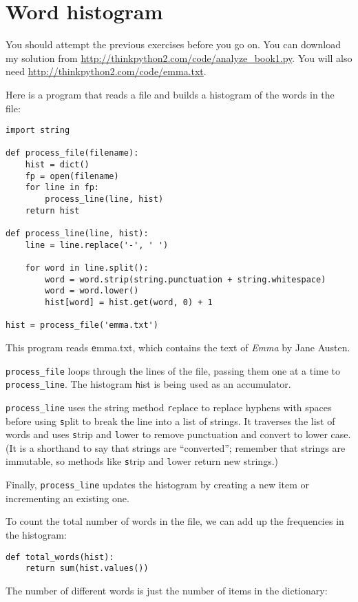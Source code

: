 \documentclass[
DIV=11,
fontsize=13,
twoside,
headinclude=false,
titlepage=firstiscover,
abstract=true,
headsepline=true,
footsepline=true,
chapterprefix=true, %
headings=big,
bibliography=totoc,%
captions=tableheading
]{scrbook}
\theoremstyle{definition}
\begin{document}
\section{Word histogram}

You should attempt the previous exercises before you go on.
You can download my solution from
 \url{http://thinkpython2.com/code/analyze_book1.py}.  You will
also need \url{http://thinkpython2.com/code/emma.txt}.

Here is a program that reads a file and builds a histogram of the
words in the file:

\begin{lstlisting}
import string

def process_file(filename):
    hist = dict()
    fp = open(filename)
    for line in fp:
        process_line(line, hist)
    return hist

def process_line(line, hist):
    line = line.replace('-', ' ')
    
    for word in line.split():
        word = word.strip(string.punctuation + string.whitespace)
        word = word.lower()
        hist[word] = hist.get(word, 0) + 1

hist = process_file('emma.txt')
\end{lstlisting}
%
This program reads {\texttt emma.txt}, which contains the text of {\em
  Emma} by Jane Austen.

\verb"process_file" loops through the lines of the file,
passing them one at a time to \verb"process_line".  The histogram
{\texttt hist} is being used as an accumulator.

\verb"process_line" uses the string method {\texttt replace} to replace
hyphens with spaces before using {\texttt split} to break the line into a
list of strings.  It traverses the list of words and uses {\texttt strip}
and {\texttt lower} to remove punctuation and convert to lower case.  (It
is a shorthand to say that strings are ``converted''; remember that
strings are immutable, so methods like {\texttt strip} and {\texttt lower}
return new strings.)

Finally, \verb"process_line" updates the histogram by creating a new
item or incrementing an existing one.

To count the total number of words in the file, we can add up
the frequencies in the histogram:

\begin{lstlisting}
def total_words(hist):
    return sum(hist.values())
\end{lstlisting}
%
The number of different words is just the number of items in
the dictionary:
\end{document}
